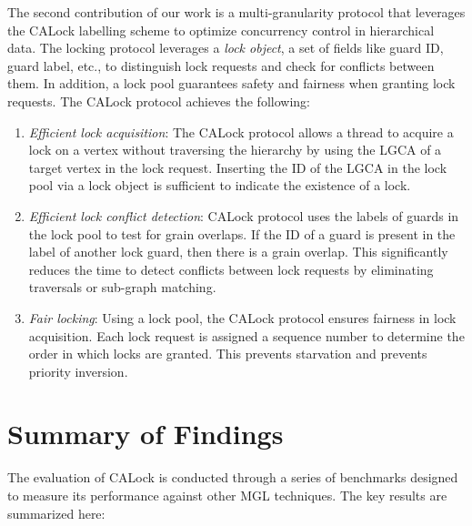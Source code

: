 The second contribution of our work is a multi-granularity protocol that leverages the CALock labelling scheme to optimize concurrency control in hierarchical data. The locking protocol leverages a \emph{lock object}, a set of fields like guard ID, guard label, etc., to distinguish lock requests and check for conflicts between them. In addition, a lock pool guarantees safety and fairness when granting lock requests. The CALock protocol achieves the following:
\begin{enumerate}
    \item \emph{Efficient lock acquisition}: The CALock protocol allows a thread to acquire a lock on a vertex without traversing the hierarchy by using the LGCA of a target vertex in the lock request. Inserting the ID of the LGCA in the lock pool via a lock object is sufficient to indicate the existence of a lock.
    \item \emph{Efficient lock conflict detection}: CALock protocol uses the labels of guards in the lock pool to test for grain overlaps. If the ID of a guard is present in the label of another lock guard, then there is a grain overlap. This significantly reduces the time to detect conflicts between lock requests by eliminating traversals or sub-graph matching. 
    \item \emph{Fair locking}: Using a lock pool, the CALock protocol ensures fairness in lock acquisition. Each lock request is assigned a sequence number to determine the order in which locks are granted. This prevents starvation and prevents priority inversion.
\end{enumerate}




\section{Summary of Findings}
The evaluation of CALock is conducted through a series of benchmarks designed to measure its performance against other MGL techniques. The key results are summarized here:

